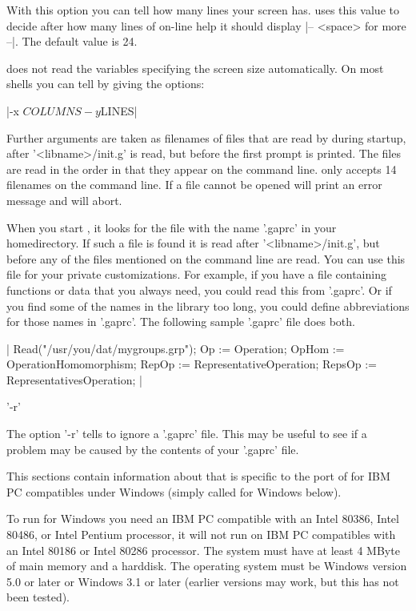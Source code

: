 With  this option  you can  tell {\GAP}  how many  lines your  screen has.
{\GAP}  uses this value to decide after  how many lines of on-line help it
should display |-- <space> for more --|. The default value is 24.

{\GAP}   does  not   read  the   variables  specifying   the  screen  size
automatically. On most shells you can tell {\GAP} by giving the options:

|-x $COLUMNS -y $LINES|

Further  arguments are taken as filenames of files that are read by {\GAP}
during  startup,  after  '<libname>/init.g'  is  read, but before the first
prompt  is printed. The files are read in  the order in that they appear on
the command line. {\GAP} only accepts 14 filenames on the command line. If
a file cannot be opened {\GAP} will print an error message and will abort.

When  you start {\GAP},  it looks for  the file with  the name '.gaprc' in
your   homedirectory.  If   such  a   file  is   found  it  is  read  after
'<libname>/init.g',  but before any  of the files  mentioned on the command
line  are read. You can use this  file for your private customizations. For
example,  if you have a  file containing functions or  data that you always
need,  you could read this from '.gaprc'. Or  if you find some of the names
in  the library too long, you could define abbreviations for those names in
'.gaprc'. The following sample '.gaprc' file does both.

|    Read("/usr/you/dat/mygroups.grp");
    Op := Operation;
    OpHom := OperationHomomorphism;
    RepOp := RepresentativeOperation;
    RepsOp := RepresentativesOperation; |

'-r'

The option '-r' tells {\GAP} to ignore a '.gaprc' file. This may be useful
to see if a problem may be caused by the contents of your '.gaprc' file.

%

This  sections contain information about  {\GAP} that is  specific to the
port  of {\GAP} for IBM PC   compatibles under Windows (simply
called {\GAP} for Windows below).

To run  {\GAP} for Windows  you  need an IBM PC   compatible with an Intel
80386, Intel 80486, or Intel Pentium processor, it will not run on IBM PC
compatibles with  an Intel 80186  or  Intel 80286 processor.   The system
must have at least 4 MByte of main  memory and a harddisk.  The operating
system  must be  Windows version  5.0  or later  or Windows  3.1  or later
(earlier versions may work, but this has not been tested).

